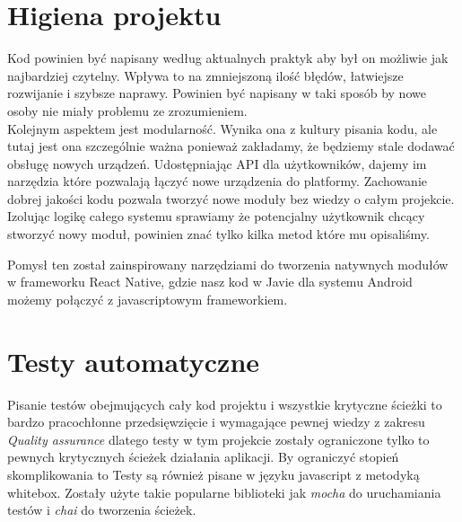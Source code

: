 \section{Higiena projektu}
Kod powinien być napisany według aktualnych praktyk aby był on możliwie jak najbardziej czytelny. Wpływa to na zmniejszoną ilość błędów, łatwiejsze rozwijanie i szybsze naprawy. Powinien być napisany w taki sposób by nowe osoby nie miały problemu ze zrozumieniem. \\
Kolejnym aspektem jest modularność. Wynika ona z kultury pisania kodu, ale tutaj jest ona szczególnie ważna ponieważ zakładamy, że będziemy stale dodawać obsługę nowych urządzeń. Udostępniając API dla użytkowników, dajemy im narzędzia które pozwalają łączyć nowe urządzenia do platformy. Zachowanie dobrej jakości kodu pozwala tworzyć nowe moduły bez wiedzy o całym projekcie. Izolując logikę całego systemu sprawiamy że potencjalny użytkownik chcący stworzyć nowy moduł, powinien znać tylko kilka metod które mu opisaliśmy. 
\par Pomysł ten został zainspirowany narzędziami do tworzenia natywnych modułów w frameworku React Native, gdzie nasz kod w Javie dla systemu Android możemy połączyć z javascriptowym frameworkiem. 
\section{Testy automatyczne}
Pisanie testów obejmujących cały kod projektu i wszystkie krytyczne ścieżki to bardzo pracochłonne przedsięwzięcie i wymagające pewnej wiedzy z zakresu \textit{Quality assurance} dlatego testy w tym projekcie zostały ograniczone tylko to pewnych krytycznych ścieżek działania aplikacji. By ograniczyć stopień skomplikowania to Testy są również pisane w języku javascript z metodyką whitebox. Zostały użyte takie popularne biblioteki jak \textit{mocha} do uruchamiania testów i \textit{chai} do tworzenia ścieżek. 